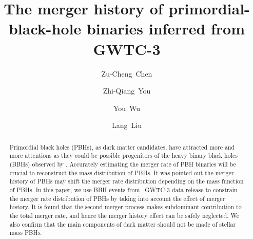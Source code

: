\documentclass[twocolumn]{aastex631}
\begin{document}
	
\title{The merger history of primordial-black-hole binaries inferred from GWTC-3}
	
\author[0000-0001-7016-9934]{Zu-Cheng~Chen}

\author[0000-0002-3309-415X]{Zhi-Qiang~You}

\author[0000-0002-3309-415X]{You~Wu}

\author[0000-0002-3309-415X]{Lang~Liu}

	

	
\begin{abstract}
Primordial black holes (PBHs), as dark matter candidates, have attracted 
more and more attentions as they could be possible progenitors of 
the heavy binary black holes (BBHs) observed by \lvc.
Accurately estimating the merger rate of PBH binaries will be crucial to
reconstruct the mass distribution of PBHs.
It was pointed out the merger history of PBHs may shift the merger rate distribution depending on the mass function of PBHs.
In this paper, we use BBH events from \lvc\ GWTC-3 data release to
constrain the merger rate distribution of PBHs by taking into account the effect of merger history.
It is found that the second merger process makes subdominant contribution to the 
total merger rate, and hence the merger history effect can be safely neglected.	
We also confirm that the main components of dark matter should not be made of stellar 
mass PBHs.

\end{abstract}
	
\end{document}
